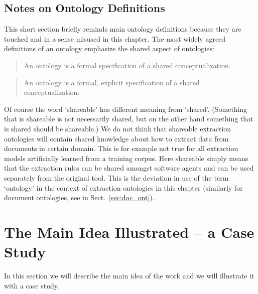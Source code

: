\subsection{Notes on Ontology Definitions}
This short section briefly reminds main ontology definitions because they are touched and in a sense misused in this chapter. The most widely agreed definitions of an ontology emphasize the shared aspect of ontologies: 
\begin{quote}
An ontology is a formal specification of a shared conceptualization.	\citep{so17864}
\end{quote}

\begin{quote}
An ontology is a formal, explicit specification of a shared conceptualization. \citep{Studer1998161}
\end{quote}

Of course the word `shareable' has different meaning from `shared'. (Something that is shareable is not necessarily shared, but on the other hand something that is shared should be shareable.) We do not think that shareable extraction ontologies will contain shared knowledge about how to extract data from documents in certain domain. This is for example not true for all extraction models artificially learned from a training corpus. Here shareable simply means that the extraction rules can be shared amongst software agents and can be used separately from the original tool. This is the deviation in use of the term `ontology' in the context of extraction ontologies in this chapter (similarly for document ontologies, see in Sect.~\ref{sec:doc_ont}).







\section{The Main Idea Illustrated -- a Case Study} \label{sec:case}

In this section we will describe the main idea of the work and we will illustrate it with a case study.

